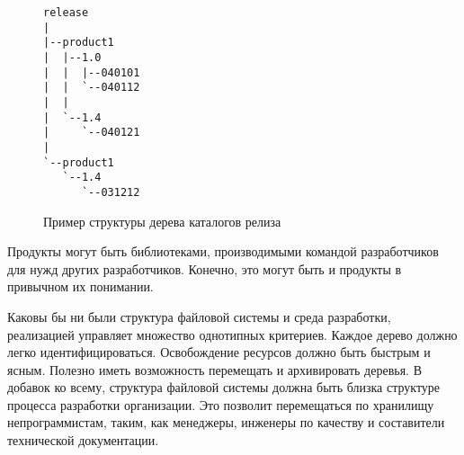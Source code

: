 \begin{figure}
{\footnotesize
\begin{verbatim}
release
|
|--product1
|  |--1.0
|  |  |--040101
|  |  `--040112
|  |
|  `--1.4
|     `--040121
|
`--product1
   `--1.4
      `--031212
\end{verbatim}
}
\caption{Пример структуры дерева каталогов релиза}
\label{fig:release_tree_layout}
\end{figure}

Продукты могут быть библиотеками, производимыми командой разработчиков
для нужд других разработчиков. Конечно, это могут быть и продукты в
привычном их понимании.

Каковы бы ни были структура файловой системы и среда разработки,
реализацией управляет множество однотипных критериев. Каждое дерево
должно легко идентифицироваться. Освобождение ресурсов должно быть
быстрым и ясным. Полезно иметь возможность перемещать и архивировать
деревья. В добавок ко всему, структура файловой системы должна быть
близка структуре процесса разработки организации. Это позволит
перемещаться по хранилищу непрограммистам, таким, как менеджеры,
инженеры по качеству и составители технической документации. 
